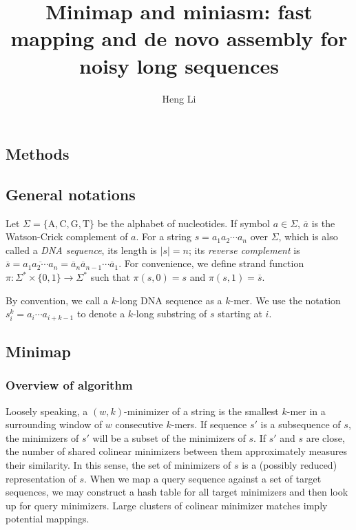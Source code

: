 \documentclass{bioinfo}
\begin{document}

\title[Long-read mapping and assembly]{Minimap and miniasm: fast mapping and de novo assembly for noisy long sequences}
\author[Li]{Heng Li}
\address{Broad Institute, 75 Ames Street, Cambridge, MA 02142, USA}
\maketitle

\begin{methods}

\section{Methods}

\subsection{General notations}

Let $\Sigma=\{\mathrm{A},\mathrm{C},\mathrm{G},\mathrm{T}\}$ be the
alphabet of nucleotides. If symbol $a\in\Sigma$, $\overline{a}$ is the
Watson-Crick complement of $a$. For a string $s=a_1a_2\cdots a_n$ over
$\Sigma$, which is also called a \emph{DNA sequence}, its length is $|s|=n$;
its \emph{reverse complement} is $\overline{s}=\overline{a_1a_2\cdots
a_n}=\overline{a}_n\overline{a}_{n-1}\cdots\overline{a}_1$.
For convenience, we define strand function
$\pi:\Sigma^*\times\{0,1\}\to\Sigma^*$ such that $\pi(s,0)=s$ and
$\pi(s,1)=\overline{s}$.

By convention, we call a $k$-long DNA sequence as a $k$-mer. We use the
notation $s^k_i=a_i\cdots a_{i+k-1}$ to denote a $k$-long substring of $s$
starting at $i$.

\subsection{Minimap}

\subsubsection{Overview of algorithm}

Loosely speaking, a $(w,k)$-minimizer \citep{Roberts:2004fv} of a string is the
smallest $k$-mer in a surrounding window of $w$ consecutive $k$-mers. If
sequence $s'$ is a subsequence of $s$, the minimizers of $s'$ will be a subset
of the minimizers of $s$. If $s'$ and $s$ are close, the number of shared
colinear minimizers between them approximately measures their similarity. In
this sense, the set of minimizers of $s$ is a (possibly reduced) representation
of $s$. When we map a query sequence against a set of target sequences, we may
construct a hash table for all target minimizers and then look up for query
minimizers. Large clusters of colinear minimizer matches imply potential
mappings.


\end{methods}
\end{document}
